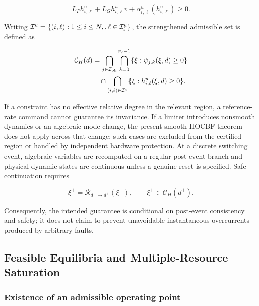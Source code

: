\documentclass[11pt,twocolumn]{article}
\begin{document}
\begin{equation}\label{eq:reference-barrier}
L_Fh^u_{i,\ell}+L_Gh^u_{i,\ell}v
+\alpha^u_{i,\ell}(h^u_{i,\ell})\geq0.
\end{equation}

Writing $\mathcal I^u=\{(i,\ell):1\leq i\leq N,\\,\ell\in\mathcal I_i^u\}$, the strengthened admissible set is defined as

\begin{equation}\label{eq:ch}
\begin{aligned}
\mathcal C_H(d)
&=\bigcap_{j\in\mathcal I_{\rm ph}}
\bigcap_{k=0}^{r_j-1}\{\xi:\psi_{j,k}(\xi,d)\geq0\}\\
&\quad\cap\bigcap_{(i,\ell)\in\mathcal I^u}
\{\xi:h^u_{i,\ell}(\xi,d)\geq0\}.
\end{aligned}
\end{equation}

If a constraint has no effective relative degree in the relevant region, a reference-rate command cannot guarantee its invariance. If a limiter introduces nonsmooth dynamics or an algebraic-mode change, the present smooth HOCBF theorem does not apply across that change; such cases are excluded from the certified region or handled by independent hardware protection. At a discrete switching event, algebraic variables are recomputed on a regular post-event branch and physical dynamic states are continuous unless a genuine reset is specified. Safe continuation requires

\begin{equation}\label{eq:reset}
\xi^+=\mathcal R_{d^-\rightarrow d^+}(\xi^-),\qquad
\xi^+\in\mathcal C_H(d^+).
\end{equation}

Consequently, the intended guarantee is conditional on post-event consistency and safety; it does not claim to prevent unavoidable instantaneous overcurrents produced by arbitrary faults.

\subsection{Feasible Equilibria and Multiple-Resource Saturation}

\label{subsec:feasibility}

\subsubsection{Existence of an admissible operating point}
\end{document}
